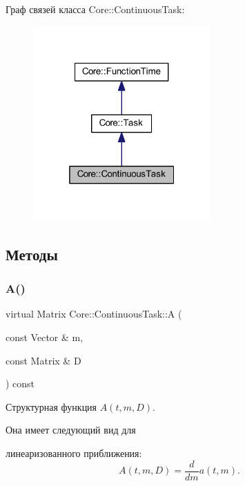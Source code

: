 Граф связей класса Core\+:\+:Continuous\+Task\+:
\nopagebreak
\begin{figure}[H]
\begin{center}
\leavevmode
\includegraphics[width=193pt]{class_core_1_1_continuous_task__coll__graph}
\end{center}
\end{figure}


\subsection{Методы}
\hypertarget{class_core_1_1_continuous_task_a75fbac1abe67223cd7938b724c5cce45}{}\label{class_core_1_1_continuous_task_a75fbac1abe67223cd7938b724c5cce45} 
\subsubsection{\texorpdfstring{A()}{A()}}
{\footnotesize\ttfamily virtual Matrix Core\+::\+Continuous\+Task\+::A (\begin{DoxyParamCaption}\item[{const Vector \&}]{m,  }\item[{const Matrix \&}]{D }\end{DoxyParamCaption}) const\hspace{0.3cm}{\ttfamily [pure virtual]}}



Структурная функция $A(t, m, D)$. 

Она имеет следующий вид для


\begin{DoxyItemize}
\item линеаризованного приближения\+: \[A(t, m, D) = \frac{d}{dm} a(t, m).\] 
\end{DoxyItemize}

